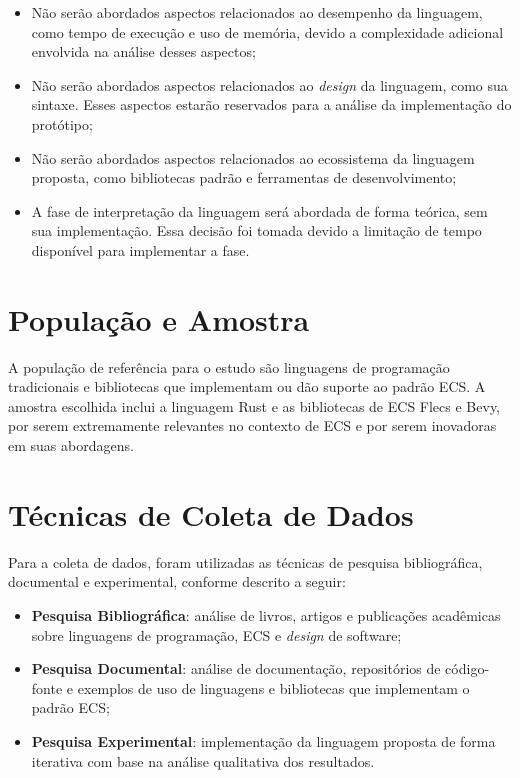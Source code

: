 \begin{itemize}
    \item Não serão abordados aspectos relacionados ao desempenho da linguagem, como tempo de execução e uso de memória, devido a complexidade adicional envolvida na análise desses aspectos;
    \item Não serão abordados aspectos relacionados ao \textit{design} da linguagem, como sua sintaxe. Esses aspectos estarão reservados para a análise da implementação do protótipo;
    \item Não serão abordados aspectos relacionados ao ecossistema da linguagem proposta, como bibliotecas padrão e ferramentas de desenvolvimento;
    \item A fase de interpretação da linguagem será abordada de forma teórica, sem sua implementação. Essa decisão foi tomada devido a limitação de tempo disponível para implementar a fase.
\end{itemize}

\section{População e Amostra}

A população de referência para o estudo são linguagens de programação tradicionais e bibliotecas que implementam ou dão suporte ao padrão ECS. A amostra escolhida inclui a linguagem Rust e as bibliotecas de ECS Flecs e Bevy, por serem extremamente relevantes no contexto de ECS e por serem inovadoras em suas abordagens.

\section{Técnicas de Coleta de Dados}

Para a coleta de dados, foram utilizadas as técnicas de pesquisa bibliográfica, documental e experimental, conforme descrito a seguir:

\begin{itemize}
    \item \textbf{Pesquisa Bibliográfica}: análise de livros, artigos e publicações acadêmicas sobre linguagens de programação, ECS e \textit{design} de software;
    \item \textbf{Pesquisa Documental}: análise de documentação, repositórios de código-fonte e exemplos de uso de linguagens e bibliotecas que implementam o padrão ECS;
    \item \textbf{Pesquisa Experimental}: implementação da linguagem proposta de forma iterativa com base na análise qualitativa dos resultados.
\end{itemize}

